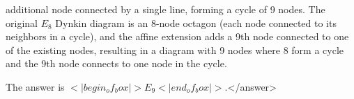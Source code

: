 additional node connected by a single line, forming a cycle of 9 nodes. The original \( E_8 \) Dynkin diagram is an 8-node octagon (each node connected to its neighbors in a cycle), and the affine extension adds a 9th node connected to one of the existing nodes, resulting in a diagram with 9 nodes where 8 form a cycle and the 9th node connects to one node in the cycle.  

The answer is \(<|begin_of_box|>E_9<|end_of_box|>\).</answer>